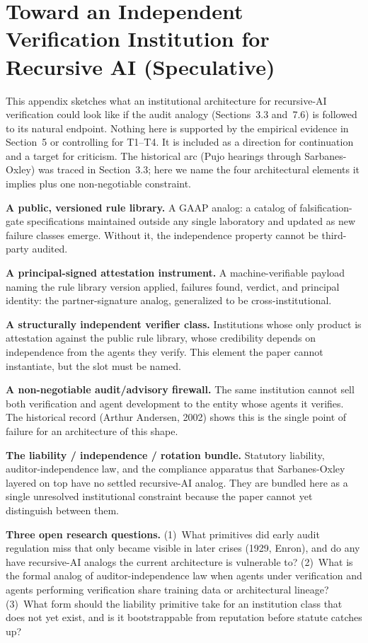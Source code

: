 \documentclass[11pt]{article}
\begin{document}
\section{Toward an Independent Verification Institution for Recursive AI (Speculative)}
\label{app:institution}

This appendix sketches what an institutional architecture for recursive-AI verification could look like if the audit analogy (Sections~3.3 and~7.6) is followed to its natural endpoint. Nothing here is supported by the empirical evidence in Section~5 or controlling for T1--T4. It is included as a direction for continuation and a target for criticism. The historical arc (Pujo hearings through Sarbanes-Oxley) was traced in Section~3.3; here we name the four architectural elements it implies plus one non-negotiable constraint.

\textbf{A public, versioned rule library.} A GAAP analog: a catalog of falsification-gate specifications maintained outside any single laboratory and updated as new failure classes emerge. Without it, the independence property cannot be third-party audited.

\textbf{A principal-signed attestation instrument.} A machine-verifiable payload naming the rule library version applied, failures found, verdict, and principal identity: the partner-signature analog, generalized to be cross-institutional.

\textbf{A structurally independent verifier class.} Institutions whose only product is attestation against the public rule library, whose credibility depends on independence from the agents they verify. This element the paper cannot instantiate, but the slot must be named.

\textbf{A non-negotiable audit/advisory firewall.} The same institution cannot sell both verification and agent development to the entity whose agents it verifies. The historical record (Arthur Andersen, 2002) shows this is the single point of failure for an architecture of this shape.

\textbf{The liability / independence / rotation bundle.} Statutory liability, auditor-independence law, and the compliance apparatus that Sarbanes-Oxley layered on top have no settled recursive-AI analog. They are bundled here as a single unresolved institutional constraint because the paper cannot yet distinguish between them.

\textbf{Three open research questions.} (1)~What primitives did early audit regulation miss that only became visible in later crises (1929, Enron), and do any have recursive-AI analogs the current architecture is vulnerable to? (2)~What is the formal analog of auditor-independence law when agents under verification and agents performing verification share training data or architectural lineage? (3)~What form should the liability primitive take for an institution class that does not yet exist, and is it bootstrappable from reputation before statute catches up?
\end{document}
